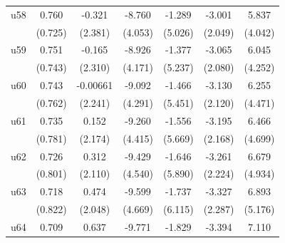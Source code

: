 \begin{table}[htbp]
\begin{tabular}{l*{6}{c}}
\addlinespace
u58                 &       0.760         &      -0.321         &      -8.760\sym{**} &      -1.289         &      -3.001         &       5.837         \\
                    &     (0.725)         &     (2.381)         &     (4.053)         &     (5.026)         &     (2.049)         &     (4.042)         \\
\addlinespace
u59                 &       0.751         &      -0.165         &      -8.926\sym{**} &      -1.377         &      -3.065         &       6.045         \\
                    &     (0.743)         &     (2.310)         &     (4.171)         &     (5.237)         &     (2.080)         &     (4.252)         \\
\addlinespace
u60                 &       0.743         &    -0.00661         &      -9.092\sym{**} &      -1.466         &      -3.130         &       6.255         \\
                    &     (0.762)         &     (2.241)         &     (4.291)         &     (5.451)         &     (2.120)         &     (4.471)         \\
\addlinespace
u61                 &       0.735         &       0.152         &      -9.260\sym{**} &      -1.556         &      -3.195         &       6.466         \\
                    &     (0.781)         &     (2.174)         &     (4.415)         &     (5.669)         &     (2.168)         &     (4.699)         \\
\addlinespace
u62                 &       0.726         &       0.312         &      -9.429\sym{**} &      -1.646         &      -3.261         &       6.679         \\
                    &     (0.801)         &     (2.110)         &     (4.540)         &     (5.890)         &     (2.224)         &     (4.934)         \\
\addlinespace
u63                 &       0.718         &       0.474         &      -9.599\sym{**} &      -1.737         &      -3.327         &       6.893         \\
                    &     (0.822)         &     (2.048)         &     (4.669)         &     (6.115)         &     (2.287)         &     (5.176)         \\
\addlinespace
u64                 &       0.709         &       0.637         &      -9.771\sym{**} &      -1.829         &      -3.394         &       7.110         \\

\end{tabular}
\end{table}
